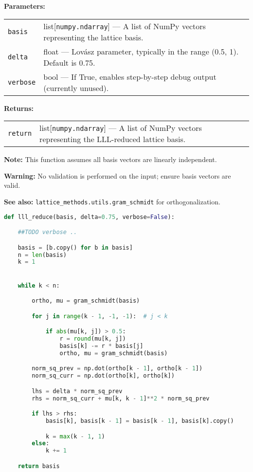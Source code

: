 \documentclass[a4paper,12pt]{article}
\begin{document}
\vspace{1em}
\noindent
\textbf{Parameters:}

\vspace{0.5em}
\begin{tabular}{p{3cm} p{11cm}}
\texttt{basis} & list[\texttt{numpy.ndarray}] — A list of NumPy vectors representing the lattice basis. \\
\texttt{delta} & float — Lovász parameter, typically in the range (0.5, 1). Default is 0.75. \\
\texttt{verbose} & bool — If True, enables step-by-step debug output (currently unused). \\
\end{tabular}

\vspace{1em}
\noindent
\textbf{Returns:}

\vspace{0.5em}
\begin{tabular}{p{3cm} p{11cm}}
\texttt{return} & list[\texttt{numpy.ndarray}] — A list of NumPy vectors representing the LLL-reduced lattice basis. \\
\end{tabular}

\vspace{1em}
\noindent
\textbf{Note:}  
This function assumes all basis vectors are linearly independent.

\vspace{1em}
\noindent
\textbf{Warning:}  
No validation is performed on the input; ensure basis vectors are valid.

\vspace{1em}
\noindent
\textbf{See also:}  
\texttt{lattice\_methods.utils.gram\_schmidt} for orthogonalization.

\begin{lstlisting}[language=Python]
def lll_reduce(basis, delta=0.75, verbose=False):

    ##TODO verbose ..

    basis = [b.copy() for b in basis]
    n = len(basis)
    k = 1


    while k < n:

        ortho, mu = gram_schmidt(basis)

        for j in range(k - 1, -1, -1):  # j < k

            if abs(mu[k, j]) > 0.5:
                r = round(mu[k, j])
                basis[k] -= r * basis[j]
                ortho, mu = gram_schmidt(basis)

        norm_sq_prev = np.dot(ortho[k - 1], ortho[k - 1])
        norm_sq_curr = np.dot(ortho[k], ortho[k])

        lhs = delta * norm_sq_prev
        rhs = norm_sq_curr + mu[k, k - 1]**2 * norm_sq_prev

        if lhs > rhs:
            basis[k], basis[k - 1] = basis[k - 1], basis[k].copy()

            k = max(k - 1, 1)
        else:
            k += 1

    return basis
\end{lstlisting}
\end{document}
